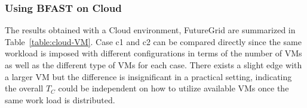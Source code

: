 \documentclass{acm_proc_article-sp}
\begin{document}


\subsubsection{Using BFAST on Cloud}

The results obtained with a Cloud environment,
FutureGrid\cite{futuregrid} are summarized in
Table~\ref{table:cloud-VM}.  Case c1 and c2 can be compared directly
since the same workload is imposed with different configurations in
terms of the number of VMs as well as the different type of VMs for
each case.  There exists a slight edge with a larger VM but the
difference is insignificant in a practical setting, indicating the
overall $T_C$ could be independent on how to utilize available VMs
once the same work load is distributed.
\end{document}
